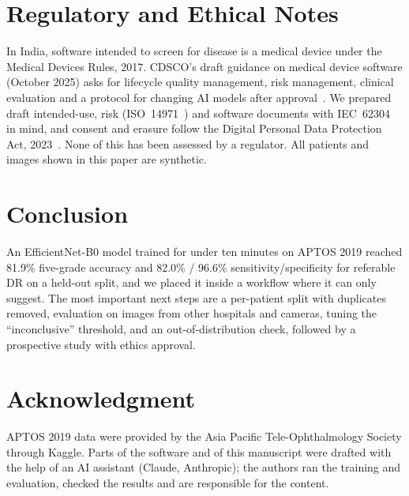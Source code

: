 \documentclass[conference]{IEEEtran}
\begin{document}
\section{Regulatory and Ethical Notes}
In India, software intended to screen for disease is a medical device under the Medical Devices Rules, 2017. CDSCO's
draft guidance on medical device software (October 2025) asks for lifecycle quality management, risk management,
clinical evaluation and a protocol for changing AI models after approval~\cite{cdsco2025}. We prepared draft
intended-use, risk (ISO~14971~\cite{iso14971}) and software documents with IEC~62304~\cite{iec62304} in mind, and
consent and erasure follow the Digital Personal Data Protection Act, 2023~\cite{dpdp2023}. None of this has been
assessed by a regulator. All patients and images shown in this paper are synthetic.

\section{Conclusion}
An EfficientNet-B0 model trained for under ten minutes on APTOS 2019 reached 81.9\% five-grade accuracy and 82.0\% /
96.6\% sensitivity/specificity for referable DR on a held-out split, and we placed it inside a workflow where it can only
suggest. The most important next steps are a per-patient split with duplicates removed, evaluation on images from
other hospitals and cameras, tuning the ``inconclusive'' threshold, and an out-of-distribution check, followed by a
prospective study with ethics approval.

\section*{Acknowledgment}
APTOS 2019 data were provided by the Asia Pacific Tele-Ophthalmology Society through Kaggle. Parts of the software
and of this manuscript were drafted with the help of an AI assistant (Claude, Anthropic); the authors ran the training
and evaluation, checked the results and are responsible for the content.
\end{document}
